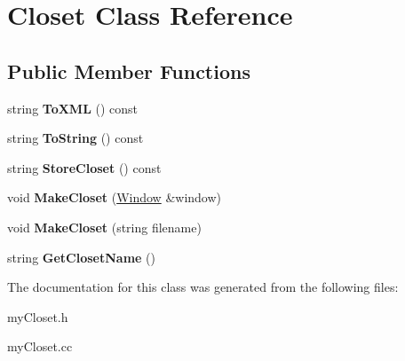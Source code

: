 \hypertarget{classCloset}{}\section{Closet Class Reference}
\label{classCloset}
\subsection*{Public Member Functions}
\begin{DoxyCompactItemize}
\item 
\mbox{\label{classCloset_a7642f749dfd4ad11a83c2cab5a3bdae2}} 
string {\bfseries To\+X\+ML} () const
\item 
\mbox{\label{classCloset_a3bad65dd75ada9a484eb7f78ebfa3b2a}} 
string {\bfseries To\+String} () const
\item 
\mbox{\label{classCloset_a1f2ec8e3e912756e35fdc55c9401ea3e}} 
string {\bfseries Store\+Closet} () const
\item 
\mbox{\label{classCloset_a22040f4192bb856429bee562c8e132c9}} 
void {\bfseries Make\+Closet} (\mbox{\hyperlink{classWindow}{Window}} \&window)
\item 
\mbox{\label{classCloset_a2c4e85a1f2a3e4ed661351df07aa4120}} 
void {\bfseries Make\+Closet} (string filename)
\item 
\mbox{\label{classCloset_a108ab29dacfccd5d1c958d5ec88ad64f}} 
string {\bfseries Get\+Closet\+Name} ()
\end{DoxyCompactItemize}


The documentation for this class was generated from the following files\+:\begin{DoxyCompactItemize}
\item 
my\+Closet.\+h\item 
my\+Closet.\+cc\end{DoxyCompactItemize}
